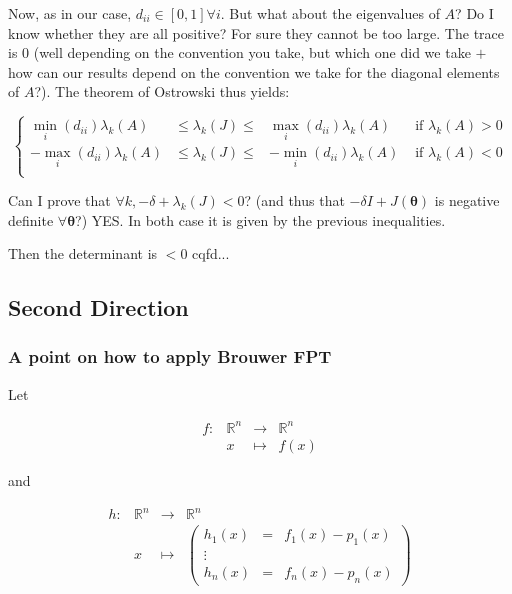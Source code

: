 \documentclass[12pt]{article}
\begin{document}
Now, as in our case, $d_{ii} \in [0,1] \forall i$. But what about the eigenvalues of $A$? Do I know whether they are all positive? For sure they cannot be too large. The trace is $0$ (well depending on the convention you take, but which one did we take $+$ how can our results depend on the convention we take for the diagonal elements of $A$?). The theorem of Ostrowski thus yields:

\[ \left\{ \begin{array}{cccr}
\min_i (d_{ii}) \lambda_k(A) & \leq \lambda_k(J) \leq & \max_i (d_{ii}) \lambda_k(A) & \text{ if } \lambda_k(A)>0 \\
- \max_i (d_{ii}) \lambda_k(A) & \leq \lambda_k(J) \leq & - \min_i (d_{ii}) \lambda_k(A) & \text{ if } \lambda_k(A)<0 \\ 
\end{array} \right. \]

Can I prove that $\forall k, -\delta + \lambda_k(J) <0$? (and thus that $-\delta I + J(\bm{\theta})$ is negative definite $\forall \bm{\theta}$?) YES. In both case it is given by the previous inequalities.

Then the determinant is $<0$ cqfd...







\subsection{Second Direction}
\subsubsection{A point on how to apply Brouwer FPT}

Let 

\[ \begin{array}{lccc}
 f : & \mathbb{R}^n & \rightarrow & \mathbb{R}^n \\
 & x & \mapsto & f(x) \end{array} \]

and

\[ \begin{array}{lccc}
h : & \mathbb{R}^n & \rightarrow & \mathbb{R}^n \\
 & x & \mapsto & \begin{pmatrix} h_1(x) & = & f_1(x)-p_1(x) \\
\vdots \\
h_n(x) & = & f_n(x)-p_n(x) \end{pmatrix}
 \end{array} \]
\end{document}
